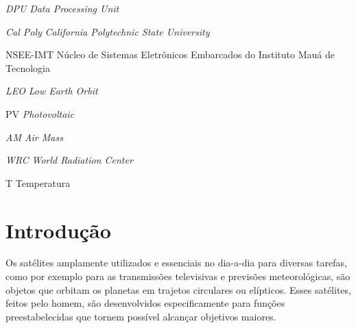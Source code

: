 \documentclass[
	12pt,				%
	openright,			%
	oneside,			%
	a4paper,			%
	english,			%
	french,				%
	spanish,			%
	brazil,				%
	oldfontcommands
	]{abntex2}
\begin{document}
\begin{siglas}

  \item[\textit{DPU}] \textit{Data Processing Unit}
  \item[\textit{Cal Poly}] \textit{California Polytechnic State University}
  \item[NSEE-IMT] Núcleo de Sistemas Eletrônicos Embarcados do Instituto Mauá de Tecnologia
  \item[\textit{LEO}] \textit{Low Earth Orbit}
  \item[PV] \textit{Photovoltaic}
  \item[\textit{AM}] \textit{Air Mass}
  \item[\textit{WRC}] \textit{World Radiation Center}
  \item[T] Temperatura
  
\end{siglas}


\tableofcontents*
\cleardoublepage



\textual

\chapter[Introdução]{Introdução}

	Os satélites amplamente utilizados e essenciais no dia-a-dia para diversas tarefas, como por exemplo para as transmissões televisivas e previsões meteorológicas, são objetos que orbitam os planetas em trajetos circulares ou elípticos. Esses satélites, feitos pelo homem, são desenvolvidos especificamente para funções preestabelecidas que tornem possível alcançar objetivos maiores. 
	
\end{document}
